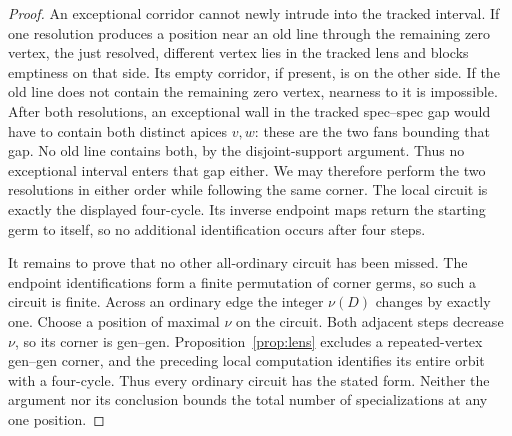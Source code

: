 \documentclass[11pt]{article}
\theoremstyle{definition}\newtheorem{definition}[theorem]{Definition}
\begin{document}
\begin{proof}
An exceptional corridor cannot newly intrude into the tracked interval.
If one resolution produces a position near an old line through the
remaining zero vertex, the just resolved, different vertex lies in the
tracked lens and blocks emptiness on that side. Its empty corridor, if
present, is on the other side. If the old line does not contain the
remaining zero vertex, nearness to it is impossible. After both
resolutions, an exceptional wall in the tracked spec--spec gap would
have to contain both distinct apices $v,w$: these are the two fans
bounding that gap. No old line contains both, by the disjoint-support
argument. Thus no exceptional interval enters that gap either.
We may therefore perform the two resolutions in either order while
following the same corner. The local circuit is exactly the displayed
four-cycle. Its inverse endpoint maps return the starting germ to
itself, so no additional identification occurs after four steps.

It remains to prove that no other all-ordinary circuit has been missed.
The endpoint identifications form a finite permutation of corner germs,
so such a circuit is finite. Across an ordinary edge the integer
$\nu(D)$ changes by exactly one. Choose a position of maximal $\nu$
on the circuit. Both adjacent steps decrease $\nu$, so its corner is
gen--gen. Proposition~\ref{prop:lens} excludes a repeated-vertex gen--gen corner, and the preceding
local computation identifies its entire orbit with a four-cycle.
Thus every ordinary circuit has the stated form. Neither the argument
nor its conclusion bounds the total number of specializations at any
one position.
\end{proof}
\end{document}
